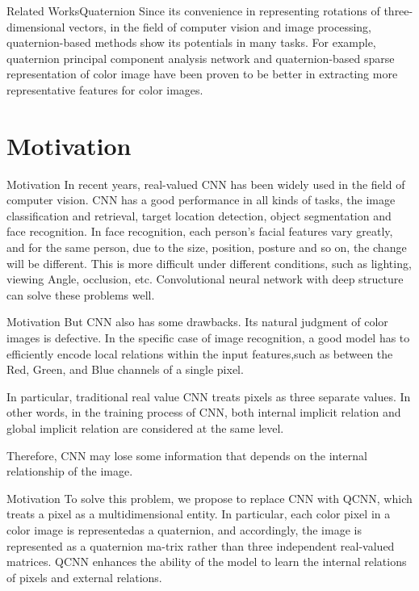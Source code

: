 \documentclass{beamer}
\begin{document}
\begin{frame}{Related Works}{Quaternion}
Since its convenience in representing rotations of three-dimensional vectors, in the field of computer vision and image processing, quaternion-based methods show its potentials in many tasks. For example, quaternion principal component analysis network\cite{ZENG2016416} and quaternion-based sparse representation of color image\cite{6607436} have been proven to be better in extracting more representative features for color images.
\end{frame}





\section{Motivation}
\begin{frame}{Motivation}
In recent years, real-valued CNN has been widely used in the field of computer vision. CNN has a good performance in all kinds of tasks, the image classification and retrieval, target location detection, object segmentation and face recognition. In face recognition, each person's facial features vary greatly, and for the same person, due to the size, position, posture and so on, the change will be different. This is more difficult under different conditions, such as lighting, viewing Angle, occlusion, etc\cite{9065279}. Convolutional neural network with deep structure can solve these problems well.
\end{frame}
\begin{frame}{Motivation}
But CNN also has some drawbacks. Its natural judgment of color images is defective\cite{parcollet:hal-02107644}.
In the specific case of image recognition, a good model has to efficiently encode local relations within the input features,such as between the Red, Green, and Blue channels of a single pixel.


In particular, traditional real value CNN treats pixels as three separate values. In other words, in the training process of CNN, both internal implicit relation and global implicit relation are considered at the same level.

Therefore, CNN may lose some information that depends on the internal relationship of the image.
\end{frame}
\begin{frame}{Motivation}
To solve this problem, we propose to replace CNN with QCNN, which treats a pixel as a multidimensional entity.
In particular, each color pixel in a color image is representedas a quaternion, and accordingly, the image is represented as a quaternion ma-trix rather than three independent real-valued matrices.
QCNN enhances the ability of the model to learn the internal relations of pixels and external relations.
\end{frame}
\end{document}
